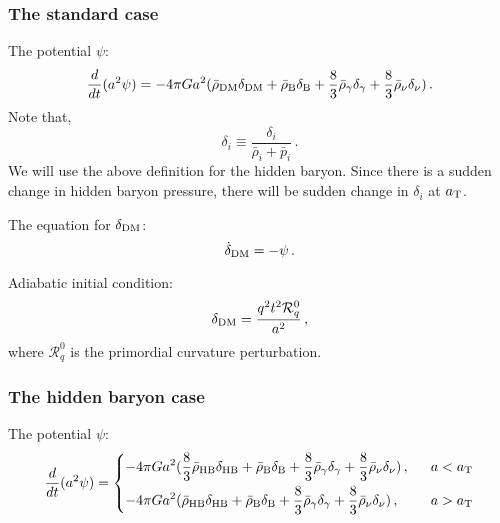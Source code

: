 \documentclass[preprint,nofootinbib,aps,prd,showpacs,superscriptaddress,groupedaddress,amsmath,longbibliography]{revtex4-1}
\begin{document}
\subsubsection{The standard case}
The potential $\psi$:  
\begin{equation}\label{eq:potential-sd}
    \frac{d}{dt}(a^2\psi) = -4\pi Ga^2(\bar{\rho}_{\rm{DM}}\delta_{\rm{DM}}+\bar{\rho}_{\rm{B}}\delta_{\rm{B}}+\frac{8}{3}\bar{\rho}_{\gamma}\delta_{\gamma}+\frac{8}{3}\bar{\rho}_{\nu}\delta_{\nu})\,.
\end{equation}
Note that,
\begin{equation}\label{eq:delta-definition}
    \delta_i \equiv \frac{\delta_i}{\bar{\rho}_i+\bar{p}_i}\,.
\end{equation}
We will use the above definition for the hidden baryon. Since there is a sudden change in hidden baryon pressure, there will be sudden change in $\delta_i$ at $a_{\rm{T}}$.

The equation for $\delta_{\rm{DM}}$:
\begin{equation}\label{eq:delta_DM-dot-sq}
    \dot{\delta}_{\rm{DM}} = -\psi\,.
\end{equation}

Adiabatic initial condition:
\begin{equation}\label{eq:delta_DM_init-sq}
    \delta_{\rm{DM}} = \frac{q^2t^2\mathcal{R}^0_q}{a^2}\,,
\end{equation}
where $\mathcal{R}^0_q$ is the primordial curvature perturbation.

\subsubsection{The hidden baryon case}

The potential $\psi$:  
\begin{equation}\label{eq:potential-hb}
    \frac{d}{dt}(a^2\psi) = 
    \begin{dcases}
    -4\pi Ga^2(\frac{8}{3}\bar{\rho}_{\rm{HB}}\delta_{\rm{HB}}+\bar{\rho}_{\rm{B}}\delta_{\rm{B}}+\frac{8}{3}\bar{\rho}_{\gamma}\delta_{\gamma}+\frac{8}{3}\bar{\rho}_{\nu}\delta_{\nu})\,, & ~~ a< a_{\rm{T}} \\
    -4\pi Ga^2(\bar{\rho}_{\rm{HB}}\delta_{\rm{HB}}+\bar{\rho}_{\rm{B}}\delta_{\rm{B}}+\frac{8}{3}\bar{\rho}_{\gamma}\delta_{\gamma}+\frac{8}{3}\bar{\rho}_{\nu}\delta_{\nu})\,, & ~~ a> a_{\rm{T}}
    \end{dcases}
\end{equation}
\end{document}
